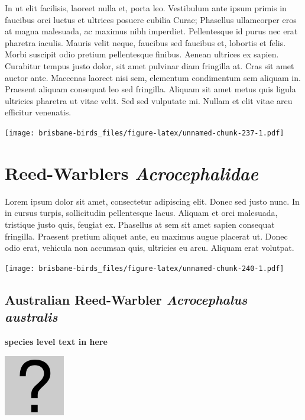 \documentclass[]{book}
\let\origfigure\figure
\let\endorigfigure\endfigure
\renewenvironment{figure}[1][2] {
  \expandafter\origfigure\expandafter[H]
} {
  \endorigfigure
}
\begin{document}
In ut elit facilisis, laoreet nulla et, porta leo. Vestibulum ante ipsum
primis in faucibus orci luctus et ultrices posuere cubilia Curae;
Phasellus ullamcorper eros at magna malesuada, ac maximus nibh
imperdiet. Pellentesque id purus nec erat pharetra iaculis. Mauris velit
neque, faucibus sed faucibus et, lobortis et felis. Morbi suscipit odio
pretium pellentesque finibus. Aenean ultrices ex sapien. Curabitur
tempus justo dolor, sit amet pulvinar diam fringilla at. Cras sit amet
auctor ante. Maecenas laoreet nisi sem, elementum condimentum sem
aliquam in. Praesent aliquam consequat leo sed fringilla. Aliquam sit
amet metus quis ligula ultricies pharetra ut vitae velit. Sed sed
vulputate mi. Nullam et elit vitae arcu efficitur venenatis.

\begin{figure}
\centering
\texttt{[image: brisbane-birds\_files/figure-latex/unnamed-chunk-237-1.pdf]}
\caption{\label{fig:unnamed-chunk-237}insert figure caption}
\end{figure}

\chapter{\texorpdfstring{Reed-Warblers
\emph{Acrocephalidae}}{Reed-Warblers Acrocephalidae}}\label{reed-warblers-acrocephalidae}

Lorem ipsum dolor sit amet, consectetur adipiscing elit. Donec sed justo
nunc. In in cursus turpis, sollicitudin pellentesque lacus. Aliquam et
orci malesuada, tristique justo quis, feugiat ex. Phasellus at sem sit
amet sapien consequat fringilla. Praesent pretium aliquet ante, eu
maximus augue placerat ut. Donec odio erat, vehicula non accumsan quis,
ultricies eu arcu. Aliquam erat volutpat.

\texttt{[image: brisbane-birds\_files/figure-latex/unnamed-chunk-240-1.pdf]}

\section{\texorpdfstring{Australian Reed-Warbler \emph{Acrocephalus
australis}}{Australian Reed-Warbler Acrocephalus australis}}\label{australian-reed-warbler-acrocephalus-australis}

\textbf{species level text in here}

\begin{figure}
\centering
\includegraphics{assets/missing.png}
\caption{No image for species}
\end{figure}
\end{document}
